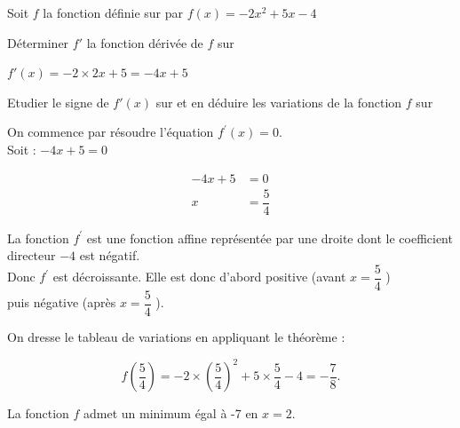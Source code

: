 \documentclass[12pt,a4paper]{book}
\begin{document}

Soit $f$ la fonction définie sur \R par $f(x)=-2x^2+5x-4$
\begin{enumMet}
	\item Déterminer $f'$ la fonction dérivée de $f$ sur \R
	\begin{corrBox}
		$f'(x)=-2\times 2x+5=-4x+5$		
	\end{corrBox}
	\item Etudier le signe de $f'(x)$ sur \R et en déduire les variations de la fonction $f$ sur \R
	\begin{corrBox}
		On commence par résoudre l'équation $f^{\prime}(x)=0$.\\
		Soit : $-4x+5=0$
		
		$$
		\begin{aligned}
			 -4x+5&=0 \\
			 x&=\dfrac{5}{4}
		\end{aligned}
		$$
		
		La fonction $f^{\prime}$ est une fonction affine représentée par une droite dont le coefficient directeur $-4$ est négatif.\\
		Donc $f^{\prime}$ est décroissante. Elle est donc d'abord positive (avant $x=\dfrac{5}{4}$ )\\
		puis négative (après $x=\dfrac{5}{4}$ ).
		\item On dresse le tableau de variations en appliquant le théorème :
		\begin{center}
		\end{center}
		$$
		f(\dfrac{5}{4})=-2 \times (\dfrac{5}{4})^{2}+5\times \dfrac{5}{4}-4=-\dfrac{7}{8} .
		$$
		
		La fonction $f$ admet un minimum égal à -7 en $x=2$.		
	\end{corrBox}
\end{enumMet}

\end{document}
